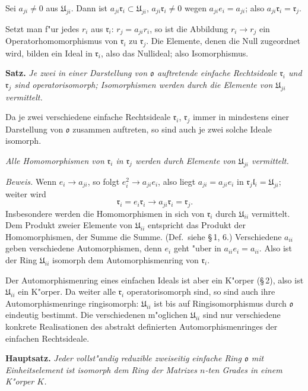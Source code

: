 \documentclass[12pt,a4paper]{article}
\theoremstyle{plain}
\begin{document}
Sei $a_{ji} \neq 0$ aus $\mathfrak{U}_{ji}$. Dann ist $a_{ji}\mathfrak{r}_i \subset \mathfrak{U}_{ji}$, $a_{ji}\mathfrak{r}_i \neq 0$ wegen $a_{ji}e_i = a_{ji}$; also $a_{ji}\mathfrak{r}_i = \mathfrak{r}_j$.

Setzt man f"ur jedes $r_i$ aus $\mathfrak{r}_i$: $r_j = a_{ji}r_i$, so ist die Abbildung $r_i \to r_j$ ein Operatorhomomorphismus von $\mathfrak{r}_i$ zu $\mathfrak{r}_j$.
Die Elemente, denen die Null zugeordnet wird, bilden ein Ideal in $\mathfrak{r}_i$, also das Nullideal; also Isomorphismus.

\medskip\noindent\textbf{Satz.}
\textit{Je zwei in einer Darstellung von $\mathfrak{o}$ auftretende einfache Rechtsideale $\mathfrak{r}_i$ und $\mathfrak{r}_j$ sind operatorisomorph; Isomorphismen werden durch die Elemente von $\mathfrak{U}_{ji}$ vermittelt.}

Da je zwei verschiedene einfache Rechtsideale $\mathfrak{r}_i$, $\mathfrak{r}_j$ immer in mindestens einer Darstellung von $\mathfrak{o}$ zusammen auftreten, so sind auch je zwei solche Ideale isomorph.

\textit{Alle Homomorphismen von $\mathfrak{r}_i$ in $\mathfrak{r}_j$ werden durch Elemente von $\mathfrak{U}_{ji}$ vermittelt.}

\noindent\textit{Beweis.}
Wenn $e_i \to a_{ji}$, so folgt $e_i^2 \to a_{ji}e_i$, also liegt $a_{ji} = a_{ji}e_i$ in $\mathfrak{r}_j\mathfrak{l}_i = \mathfrak{U}_{ji}$; weiter wird
\[
\mathfrak{r}_i = e_i\mathfrak{r}_i \to a_{ji}\mathfrak{r}_i = \mathfrak{r}_j.
\]
Insbesondere werden die Homomorphismen in sich von $\mathfrak{r}_i$ durch $\mathfrak{U}_{ii}$ vermittelt.
Dem Produkt zweier Elemente von $\mathfrak{U}_{ii}$ entspricht das Produkt der Homomorphismen, der Summe die Summe. (Def.\ siehe \S\,1, 6.) Verschiedene $a_{ii}$ geben verschiedene Automorphismen, denn $e_i$ geht "uber in $a_{ii}e_i = a_{ii}$.
Also ist der Ring $\mathfrak{U}_{ii}$ isomorph dem Automorphismenring von $\mathfrak{r}_i$.

Der Automorphismenring eines einfachen Ideals ist aber ein K"orper (\S\,2), also ist $\mathfrak{U}_{ii}$ ein K"orper.
Da weiter alle $\mathfrak{r}_i$ operatorisomorph sind, so sind auch ihre Automorphismenringe ringisomorph: $\mathfrak{U}_{ii}$ ist bis auf Ringisomorphismus durch $\mathfrak{o}$ eindeutig bestimmt.
Die verschiedenen m"oglichen $\mathfrak{U}_{ii}$ sind nur verschiedene konkrete Realisationen des abstrakt definierten Automorphismenringes der einfachen Rechtsideale.

\medskip\noindent\textbf{Hauptsatz.}
\textit{Jeder vollst"andig reduzible zweiseitig einfache Ring $\mathfrak{o}$ mit Einheitselement ist isomorph dem Ring der Matrizes $n$-ten Grades in einem K"orper $K$.}
\end{document}
